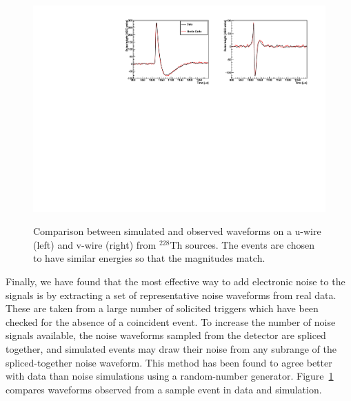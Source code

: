 \begin{figure}
\begin{center}
\includegraphics[keepaspectratio=true,width=\textwidth]{pulse_comp.pdf}
\end{center}
\renewcommand{\baselinestretch}{1}
\small\normalsize
\begin{quote}
\caption{Comparison between simulated and observed waveforms on a u-wire (left) and v-wire (right) from $^{228}$Th sources.  The events are chosen to have similar energies so that the magnitudes match.~\cite{MCDocumentRun2a}}
\label{fig:MCPulseComparison}
\end{quote}
\end{figure}
\renewcommand{\baselinestretch}{2}
\small\normalsize

Finally, we have found that the most effective way to add electronic noise to the signals is by extracting a set of representative noise waveforms from real data.  These are taken from a large number of solicited triggers which have been checked for the absence of a coincident event.  To increase the number of noise signals available, the noise waveforms sampled from the detector are spliced together, and simulated events may draw their noise from any subrange of the spliced-together noise waveform.  This method has been found to agree better with data than noise simulations using a random-number generator.  Figure~\ref{fig:MCPulseComparison} compares waveforms observed from a sample event in data and simulation.~\cite{MCDocumentRun2a}

